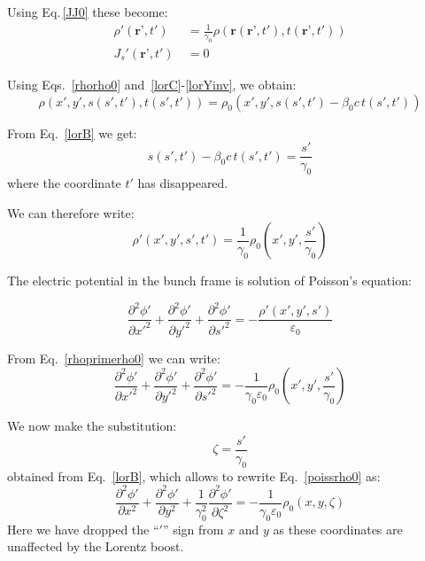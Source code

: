 \documentclass[a4paper,12pt]{report}
\begin{document}
Using Eq.\,\ref{JJ0} these become:
\begin{align}
\rho' \left(\textbf{r'}, t'\right)\ &= \frac{1}{\gamma_0}\rho\left(\textbf{r}\left(\textbf{r'}, t'\right), t\left(\textbf{r'}, t'\right)\right)
\\
J_s' \left(\textbf{r'}, t'\right)\ & = 0
\end{align}

Using Eqs.~\ref{rhorho0} and~\ref{lorC}-\ref{lorYinv}, we obtain:
\begin{equation}
\rho  \left(x', y', s(s', t'), t(s', t')\right) = \rho_0  \left(x', y', s(s', t') - \beta_0 c\,t(s', t')\right)
\end{equation}

From Eq.~\ref{lorB} we get:
\begin{equation}
s(s', t')- \beta_0 c\,t(s', t') = \frac{s'}{\gamma_0} 
\end{equation}
where the coordinate $t' $ has disappeared.

We can therefore write:
\begin{equation}
\rho' \left(x', y', s', t'\right) =   \frac{1}{\gamma_0} \rho_0  \left(x', y',  \frac{s'}{\gamma_0}\right)\label{rhoprimerho0}
\end{equation}

The electric potential in the bunch frame is solution of Poisson's equation:

\begin{equation}
\frac{\partial^2 \phi'}{\partial x'^2} +  \frac{\partial^2 \phi'}{\partial y'^2}+  \frac{\partial^2 \phi'}{\partial s'^2}= -\frac{\rho' (x', y', s')}{\varepsilon_0}
\end{equation}

From Eq.~\ref{rhoprimerho0} we can write:
\begin{equation}
\frac{\partial^2 \phi'}{\partial x'^2} +  \frac{\partial^2 \phi'}{\partial y'^2}+  \frac{\partial^2 \phi'}{\partial s'^2}= -\frac{1}{\gamma_0\varepsilon_0}  \rho_0 \left(x', y', \frac{s'}{\gamma_0}\right)\label{poissrho0}
\end{equation}

We now make the substitution:
\begin{equation}
\zeta = \frac{s'}{\gamma_0} \label{subst}
\end{equation}
obtained from Eq.~\ref{lorB}, which allows to rewrite Eq.~\ref{poissrho0} as:
\begin{equation}
\frac{\partial^2 \phi'}{\partial x^2} +  \frac{\partial^2 \phi'}{\partial y^2}+  \frac{1}{\gamma_0^2}\frac{\partial^2 \phi'}{\partial \zeta^2}=  -\frac{1}{\gamma_0\varepsilon_0}{\rho}_0 \left(x, y,\zeta\right) \label{modifpoiss}
\end{equation}
Here we have dropped the ``$'$'' sign from $x$ and $y$ as these coordinates are unaffected by the Lorentz boost.
\end{document}
